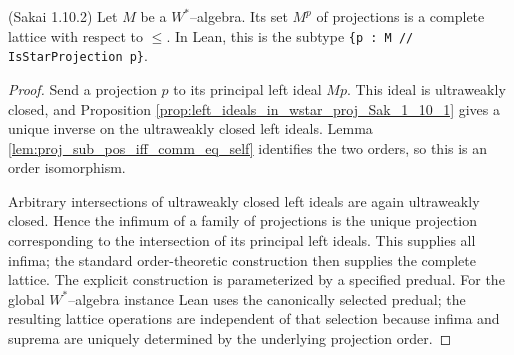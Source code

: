 \begin{proposition}
  \label{prop:proj_compl_lat_wstar_Sak_1_10_2} (Sakai 1.10.2)
  \leanok
  Let $M$ be a $W^{*}$--algebra. Its set $M^{p}$ of projections is a complete lattice with respect
  to $\le$. In Lean, this is the subtype \texttt{\{p : M // IsStarProjection p\}}.
\end{proposition}

\begin{proof}
  \leanok
  Send a projection $p$ to its principal left ideal $Mp$. This ideal is ultraweakly closed, and
  Proposition \ref{prop:left_ideals_in_wstar_proj_Sak_1_10_1} gives a unique inverse on the
  ultraweakly closed left ideals. Lemma \ref{lem:proj_sub_pos_iff_comm_eq_self} identifies the two
  orders, so this is an order isomorphism.

  Arbitrary intersections of ultraweakly closed left ideals are again ultraweakly closed. Hence the
  infimum of a family of projections is the unique projection corresponding to the intersection of
  its principal left ideals. This supplies all infima; the standard order-theoretic construction
  then supplies the complete lattice. The explicit construction is parameterized by a specified
  predual. For the global $W^{*}$--algebra instance Lean uses the canonically selected predual; the
  resulting lattice operations are independent of that selection because infima and suprema are
  uniquely determined by the underlying projection order.
\end{proof}
